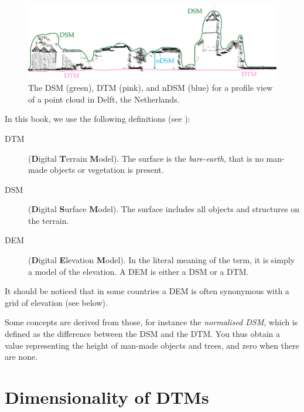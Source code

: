 \begin{figure}
  \includegraphics[width=0.9\linewidth]{figs/destm}
  \caption{The DSM (green), DTM (pink), and nDSM (blue) for a profile view of a point cloud in Delft, the Netherlands.}%
\end{figure}
In this book, we use the following definitions (see ):
\begin{description}
  \item[DTM] (\textbf{D}igital \textbf{T}errain \textbf{M}odel). The surface is the \emph{bare-earth}, that is no man-made objects or vegetation is present.
  \item[DSM] (\textbf{D}igital \textbf{S}urface \textbf{M}odel). The surface includes all objects and structures on the terrain.
  \item[DEM] (\textbf{D}igital \textbf{E}levation \textbf{M}odel). In the literal meaning of the term, it is simply a model of the elevation. A DEM is either a DSM or a DTM\@. 
\end{description}

It should be noticed that in some countries a DEM is often synonymous with a grid of elevation (see below).

Some concepts are derived from those, for instance the \emph{normalised DSM},%
which is defined as the difference between the DSM and the DTM\@.
You thus obtain a value representing the height of man-made objects and trees, and zero when there are none.




%
\section{Dimensionality of DTMs}

